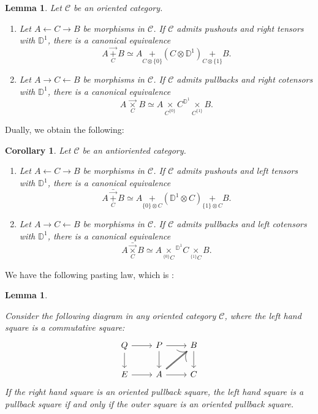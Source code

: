 \documentclass[10pt,oneside]{article}
\numberwithin{equation}{section} %
\numberwithin{figure}{section} %
\theoremstyle{plain}
\newtheorem{lemma}[theorem]{Lemma}
\newtheorem{corollary}[theorem]{Corollary}
\theoremstyle{definition}
\newcommand{\bD}{{\mathbb D}}
\renewcommand{\P}{{\mathbb P}}
\newcommand{\mC}{{\mathcal C}}
\newcommand{\A}{A}
\newcommand{\B}{B}
\newcommand{\C}{C}
\newcommand{\E}{{E}}
\renewcommand{\P}{{P}}
\newcommand{\Q}{{Q}}
\newcommand{\ot}{\otimes}
\begin{document}
\begin{lemma}\label{0desc}\label{adesc}
Let $\mC$ be an oriented category.
\begin{enumerate}[\normalfont(1)]\setlength{\itemsep}{-2pt}
\item Let $A \leftarrow C \to \B$ be morphisms in $\mC$. If $\mC$ admits pushouts and right tensors with $\bD^1$, 
there is a canonical equivalence $$\A\,\underset{C}{\vec{+}}\, \B \simeq \A\!\!\underset{C \otimes \{0\}}{+} \!\!(\C \ot \bD^1) \!\!\underset{C \otimes \{1\}}{+}\!\!\B.$$	

\item Let $A \to C\leftarrow B$ be morphisms in $\mC$. If $\mC$ admits pullbacks and right cotensors with $\bD^1$, 
there is a canonical equivalence $${\A \,\underset{\C}{\vec{\times}}}\, \B \simeq \A \!\!\underset{\C^{\{0\}}}{\times} \!\!{\C^{\bD^1}}\!\!\underset{{\C^{\{1\}}}}{\times}  \!\!\B.$$	
\end{enumerate}

\end{lemma}

Dually, we obtain the following:

\begin{corollary}\label{bdesc}
Let $\mC$ be an antioriented category.
\begin{enumerate}[\normalfont(1)]\setlength{\itemsep}{-2pt}
\item 
Let $A \leftarrow C \to \B$ be morphisms in $\mC$. If $\mC$ admits pushouts and left tensors with $\bD^1$, 
there is a canonical equivalence $$\A\,\underset{C}{\bar{\vec{+}}}\, \B \simeq \A \underset{\{0\}\otimes\C}{+} ( \bD^1\ot \C) \underset{\{1\}\otimes\C}{+} \B.$$	

\item Let $A \to C\leftarrow B$ be morphisms in $\mC$. If $\mC$ admits pullbacks and left cotensors with $\bD^1$, 
there is a canonical equivalence $$\A\underset{C}{\bar{\vec{\times}}} \B \simeq \A \underset{^{\{0\}}\C}{\times}{^{\bD^1}\C} \underset{^{\{1\}}\C}{\times} \B.$$	
\end{enumerate}

\end{corollary}

We have the following pasting law, which is \cite[Lemma 3.8.11.]{oriented}:

\begin{lemma}\label{pasting}

Consider the following diagram in any oriented category $\mC$, where the left hand square is a commutative square:
\[
\begin{tikzcd}
\Q \ar{d} \ar{r} & \P \ar{r}{} \ar{d}[swap]{} & \B  \ar{d}{} \\
\E \ar{r} & \A \ar[double]{ur}{}  \ar{r}[swap]{} & \C
\end{tikzcd}
\]
If the right hand square is an oriented pullback square, the left hand square is a pullback square if and only if the outer square is an oriented pullback square.

\end{lemma}
\end{document}
